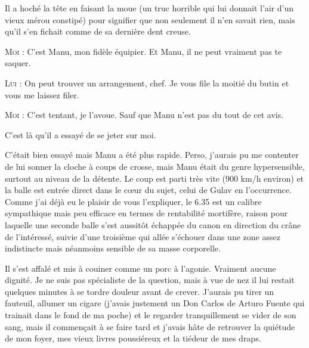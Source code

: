 Il a hoché la tête en faisant la moue (un truc horrible qui lui donnait l’air d’un vieux mérou constipé) pour signifier que non seulement il n’en savait rien, mais qu’il s’en fichait comme de sa dernière dent creuse.

\begin{dialogue}

\textsc{Moi} : C’est Manu, mon fidèle équipier. Et Manu, il ne peut vraiment pas te saquer.

\textsc{Lui} : On peut trouver un arrangement, chef. Je vous file la moitié du butin et vous me laissez filer.

\textsc{Moi} : C’est tentant, je l’avoue. Sauf que Manu n’est pas du tout de cet avis.

\end{dialogue}

C’est là qu’il a essayé de se jeter sur moi.

C’était bien essayé mais Manu a été plus rapide. Perso, j’aurais pu me contenter de lui sonner la cloche à coups de crosse, mais Manu était du genre hypersensible, surtout au niveau de la détente. Le coup est parti très vite (900 km/h environ) et la balle est entrée direct dans le cœur du sujet, celui de Gulav en l’occurrence. Comme j’ai déjà eu le plaisir de vous l’expliquer, le 6.35 est un calibre sympathique mais peu efficace en termes de rentabilité mortifère, raison pour laquelle une seconde balle s’est aussitôt échappée du canon en direction du crâne de l’intéressé, suivie d’une troisième qui allée s’échouer dans une zone assez indistincte mais néanmoins sensible de sa masse corporelle.

%
%
Il s’est affalé et mis à couiner comme un porc à l’agonie. Vraiment aucune dignité. Je ne suis pas spécialiste de la question, mais à vue de nez il lui restait quelques minutes à se tordre douleur avant de crever. J’aurais pu tirer un fauteuil, allumer un cigare (j’avais justement un Don Carlos de Arturo Fuente qui trainait dans le fond de ma poche) et le regarder tranquillement se vider de son sang, mais il commençait à se faire tard et j’avais hâte de retrouver la quiétude de mon foyer, mes vieux livres poussiéreux et la tiédeur de mes draps.

